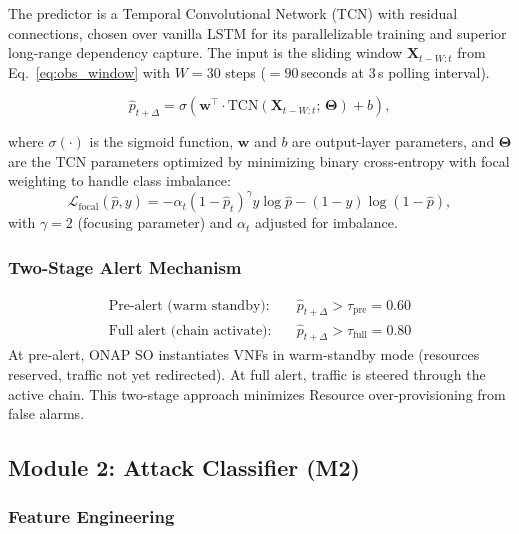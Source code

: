\documentclass[12pt, a4paper]{article}
\begin{document}
The predictor is a Temporal Convolutional Network (TCN) with residual
connections, chosen over vanilla LSTM for its parallelizable training and
superior long-range dependency capture. The input is the sliding window
$\mathbf{X}_{t-W:t}$ from Eq.~\eqref{eq:obs_window} with $W = 30$ steps
($= 90$\,seconds at 3\,s polling interval).

\begin{equation}
  \hat{p}_{t+\Delta} = \sigma\!\left(
    \mathbf{w}^\top \cdot \mathrm{TCN}\!\left(\mathbf{X}_{t-W:t};\,\boldsymbol\Theta\right)
    + b
  \right),
  \label{eq:tcn}
\end{equation}

\noindent where $\sigma(\cdot)$ is the sigmoid function, $\mathbf{w}$ and $b$
are output-layer parameters, and $\boldsymbol\Theta$ are the TCN parameters
optimized by minimizing binary cross-entropy with focal weighting to handle
class imbalance:
\begin{equation}
  \mathcal{L}_{\mathrm{focal}}(\hat{p}, y) =
  -\alpha_t (1 - \hat{p}_t)^\gamma y \log\hat{p}
  - (1 - y)\log(1 - \hat{p}),
  \label{eq:focal}
\end{equation}
with $\gamma = 2$ (focusing parameter) and $\alpha_t$ adjusted for imbalance.

\subsubsection{Two-Stage Alert Mechanism}
\begin{align}
  \text{Pre-alert (warm standby):} &\quad \hat{p}_{t+\Delta} > \tau_{\mathrm{pre}} = 0.60 \label{eq:pre}\\
  \text{Full alert (chain activate):} &\quad \hat{p}_{t+\Delta} > \tau_{\mathrm{full}} = 0.80 \label{eq:full}
\end{align}
At pre-alert, ONAP SO instantiates VNFs in warm-standby mode (resources
reserved, traffic not yet redirected). At full alert, traffic is steered
through the active chain. This two-stage approach minimizes Resource
over-provisioning from false alarms.

\subsection{Module 2: Attack Classifier (M2)}

\subsubsection{Feature Engineering}
\end{document}
